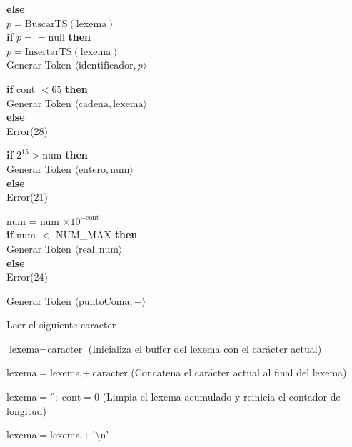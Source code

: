 \documentclass{article}
\begin{document}
\begin{description}
        \textbf{else} \\
        \hspace*{1.5em} $p = \text{BuscarTS}(\text{lexema})$ \\
        \hspace*{1.5em} \textbf{if} $p == \text{null}$ \textbf{then} \\
        \hspace*{3em} $p = \text{InsertarTS}(\text{lexema})$ \\
        \hspace*{1.5em} Generar Token $\langle \text{identificador}, p \rangle$
    \item[G16:] 
        \textbf{if} cont $< 65$ \textbf{then} \\
        \hspace*{1.5em} Generar Token $\langle \text{cadena}, \text{lexema} \rangle$ \\
        \textbf{else} \\
        \hspace*{1.5em} Error(28)
    \item[G17:] 
        \textbf{if} $2^{15} > \text{num}$ \textbf{then} \\
        \hspace*{1.5em} Generar Token $\langle \text{entero}, \text{num} \rangle$ \\
        \textbf{else} \\
        \hspace*{1.5em} Error(21)
    \item[G18:] 
        num = num $\times 10^{-\text{cont}}$ \\
        \textbf{if} num $<$ NUM\_MAX \textbf{then} \\
        \hspace*{1.5em} Generar Token $\langle \text{real}, \text{num} \rangle$ \\
        \textbf{else} \\
        \hspace*{1.5em} Error(24)
    \item[G19:] Generar Token $\langle \text{puntoComa}, - \rangle$
    \item[L:] Leer el siguiente caracter
    \item[C:] $\text{lexema} = \text{caracter}$ (Inicializa el buffer del lexema con el carácter actual)
    \item[C':] $\text{lexema} = \text{lexema} + \text{caracter}$ (Concatena el carácter actual al final del lexema)
    \item[C''] $\text{lexema} = \text{''}; \; \text{cont} = 0$ (Limpia el lexema acumulado y reinicia el contador de longitud)
    \item[N:] $\text{lexema} = \text{lexema} + \text{'\textbackslash n'}$ 
\end{description}
\end{document}

